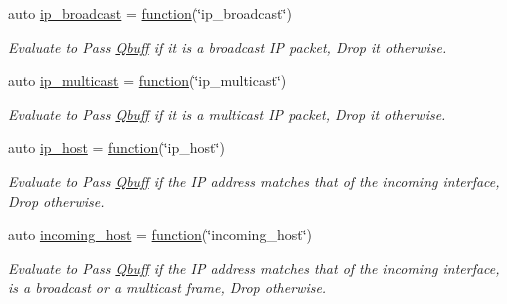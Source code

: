 \begin{DoxyCompactItemize}
auto \hyperlink{namespacepfq_1_1lang_1_1experimental_1_1anonymous__namespace_02experimental_8hpp_03_a5fbdc84e9899dc881ed25e37fbdddabc}{ip\+\_\+broadcast} = \hyperlink{namespacepfq_1_1lang_a1a4638059d700ae08d0ca63886ff2bb3}{function}(\char`\"{}ip\+\_\+broadcast\char`\"{})
\begin{DoxyCompactList}\small\item\em Evaluate to {\ttfamily Pass} \hyperlink{structpfq_1_1lang_1_1Qbuff}{Qbuff} if it is a broadcast IP packet, {\ttfamily Drop} it otherwise. \end{DoxyCompactList}\item 
auto \hyperlink{namespacepfq_1_1lang_1_1experimental_1_1anonymous__namespace_02experimental_8hpp_03_ab9e6818d6b72bab5885dda6212a3ba52}{ip\+\_\+multicast} = \hyperlink{namespacepfq_1_1lang_a1a4638059d700ae08d0ca63886ff2bb3}{function}(\char`\"{}ip\+\_\+multicast\char`\"{})
\begin{DoxyCompactList}\small\item\em Evaluate to {\ttfamily Pass} \hyperlink{structpfq_1_1lang_1_1Qbuff}{Qbuff} if it is a multicast IP packet, {\ttfamily Drop} it otherwise. \end{DoxyCompactList}\item 
auto \hyperlink{namespacepfq_1_1lang_1_1experimental_1_1anonymous__namespace_02experimental_8hpp_03_ab651cc72b27d482a4ae6c415f50780cd}{ip\+\_\+host} = \hyperlink{namespacepfq_1_1lang_a1a4638059d700ae08d0ca63886ff2bb3}{function}(\char`\"{}ip\+\_\+host\char`\"{})
\begin{DoxyCompactList}\small\item\em Evaluate to {\ttfamily Pass} \hyperlink{structpfq_1_1lang_1_1Qbuff}{Qbuff} if the IP address matches that of the incoming interface, {\ttfamily Drop} otherwise. \end{DoxyCompactList}\item 
auto \hyperlink{namespacepfq_1_1lang_1_1experimental_1_1anonymous__namespace_02experimental_8hpp_03_ac6e38127701ae032cf44cb9527131feb}{incoming\+\_\+host} = \hyperlink{namespacepfq_1_1lang_a1a4638059d700ae08d0ca63886ff2bb3}{function}(\char`\"{}incoming\+\_\+host\char`\"{})
\begin{DoxyCompactList}\small\item\em Evaluate to {\ttfamily Pass} \hyperlink{structpfq_1_1lang_1_1Qbuff}{Qbuff} if the IP address matches that of the incoming interface, is a broadcast or a multicast frame, {\ttfamily Drop} otherwise. \end{DoxyCompactList}\end{DoxyCompactItemize}


